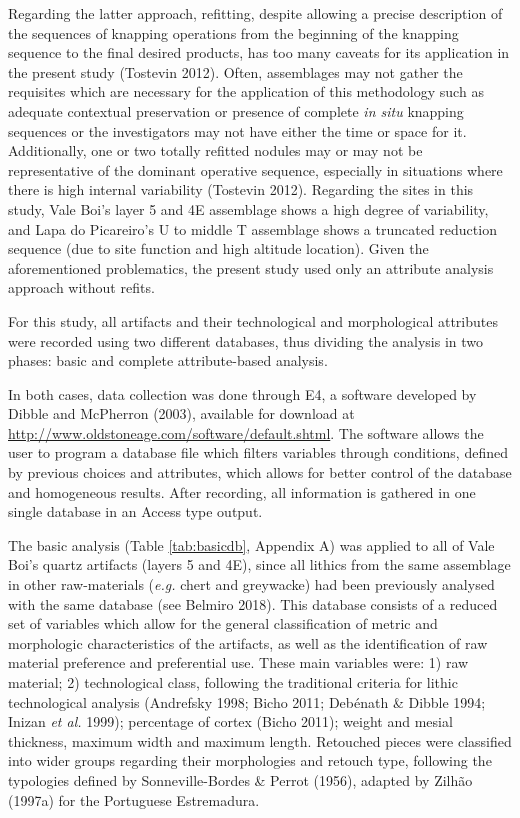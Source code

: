 \documentclass[12pt,twoside]{reedthesis}
\begin{document}
Regarding the latter approach, refitting, despite allowing a precise description of the sequences of knapping operations from the beginning of the knapping sequence to the final desired products, has too many caveats for its application in the present study (Tostevin 2012). Often, assemblages may not gather the requisites which are necessary for the application of this methodology such as adequate contextual preservation or presence of complete \emph{in situ} knapping sequences or the investigators may not have either the time or space for it. Additionally, one or two totally refitted nodules may or may not be representative of the dominant operative sequence, especially in situations where there is high internal variability (Tostevin 2012). Regarding the sites in this study, Vale Boi's layer 5 and 4E assemblage shows a high degree of variability, and Lapa do Picareiro's U to middle T assemblage shows a truncated reduction sequence (due to site function and high altitude location). Given the aforementioned problematics, the present study used only an attribute analysis approach without refits.

For this study, all artifacts and their technological and morphological attributes were recorded using two different databases, thus dividing the analysis in two phases: basic and complete attribute-based analysis.

In both cases, data collection was done through E4, a software developed by Dibble and McPherron (2003), available for download at \url{http://www.oldstoneage.com/software/default.shtml}. The software allows the user to program a database file which filters variables through conditions, defined by previous choices and attributes, which allows for better control of the database and homogeneous results. After recording, all information is gathered in one single database in an Access type output.

The basic analysis (Table \ref{tab:basicdb}, Appendix A) was applied to all of Vale Boi's quartz artifacts (layers 5 and 4E), since all lithics from the same assemblage in other raw-materials (\emph{e.g.} chert and greywacke) had been previously analysed with the same database (see Belmiro 2018). This database consists of a reduced set of variables which allow for the general classification of metric and morphologic characteristics of the artifacts, as well as the identification of raw material preference and preferential use. These main variables were: 1) raw material; 2) technological class, following the traditional criteria for lithic technological analysis (Andrefsky 1998; Bicho 2011; Debénath \& Dibble 1994; Inizan \emph{et al.} 1999); percentage of cortex (Bicho 2011); weight and mesial thickness, maximum width and maximum length. Retouched pieces were classified into wider groups regarding their morphologies and retouch type, following the typologies defined by Sonneville-Bordes \& Perrot (1956), adapted by Zilhão (1997a) for the Portuguese Estremadura.
\end{document}
